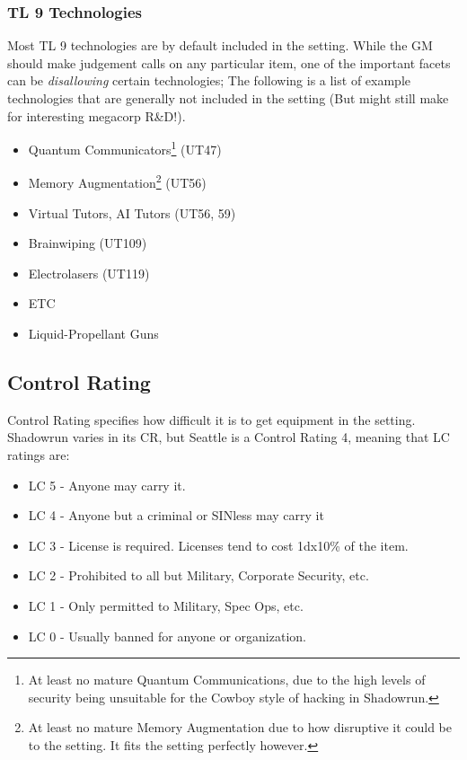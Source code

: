 \begin{multicols}{3}
	\subsubsection{TL 9 Technologies}
	
	Most TL 9 technologies are by default included in the setting. While the GM should make judgement calls on any particular item, one of the important facets can be \textit{disallowing} certain technologies; The following is a list of example technologies that are generally not included in the setting (But might still make for interesting megacorp R\&D!).
	
	\begin{itemize}
		\itemsep 0pt
		\item Quantum Communicators\footnote{At least no mature Quantum Communications, due to the high levels of security being unsuitable for the Cowboy style of hacking in Shadowrun.} (UT47)
		\item Memory Augmentation\footnote{At least no mature Memory Augmentation due to how disruptive it could be to the setting. It fits the setting perfectly however.} (UT56)
		\item Virtual Tutors, AI Tutors (UT56, 59)
		\item Brainwiping (UT109)
		\item Electrolasers (UT119)
		\item ETC
		\item Liquid-Propellant Guns
	\end{itemize}
	
	\subsection{Control Rating}
	
	Control Rating specifies how difficult it is to get equipment in the setting. Shadowrun varies in its CR, but Seattle is a Control Rating 4, meaning that LC ratings are:
	
	\begin{itemize}
		\itemsep 0pt
		\item LC 5 - Anyone may carry it.
		\item LC 4 - Anyone but a criminal or SINless may carry it
		\item LC 3 - License is required. Licenses tend to cost 1dx10\% of the item.
		\item LC 2 - Prohibited to all but Military, Corporate Security, etc.
		\item LC 1 - Only permitted to Military, Spec Ops, etc.
		\item LC 0 - Usually banned for anyone or organization.
	\end{itemize}
	

\end{multicols}
